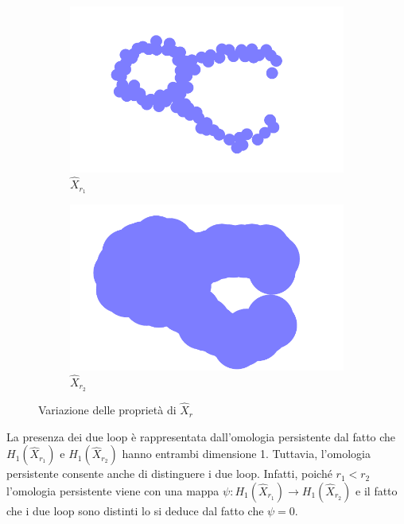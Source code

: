 \begin{figure}[ht]
  \begin{center}
    \begin{subfigure}[b]{.4\textwidth}
      \includegraphics[width=\textwidth]{gfx/double_circle_medium.pdf}
      \caption{$\widehat{X}_{r_1}$}
    \end{subfigure}
    \begin{subfigure}[b]{.4\textwidth}
      \includegraphics[width=\textwidth]{gfx/double_circle_fat.pdf}
      \caption{$\widehat{X}_{r_2}$}
    \end{subfigure}
    \caption{Variazione delle proprietà di $\widehat{X}_r$}  \label{fig2:doublecirclecomparison}
  \end{center}
\end{figure}

La presenza dei due loop è rappresentata dall'omologia persistente dal fatto che $H_1(\widehat{X}_{r_1})$ e $H_1(\widehat{X}_{r_2})$ hanno entrambi dimensione 1. Tuttavia, l'omologia persistente consente anche di distinguere i due loop. Infatti, poiché $r_1<r_2$ l'omologia persistente viene con una mappa $\psi:H_1(\widehat{X}_{r_1})\to H_1(\widehat{X}_{r_2})$ e il fatto che i due loop sono distinti lo si deduce dal fatto che $\psi=0$.

